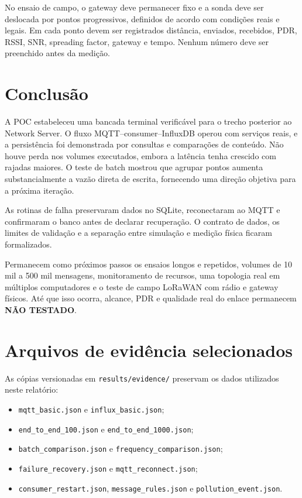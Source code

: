 \documentclass[12pt,a4paper]{article}
\newcommand{\nottested}{\textcolor{vermelhofail}{\textbf{NÃO TESTADO}}}
\newcommand{\code}[1]{\texttt{#1}}
\begin{document}
No ensaio de campo, o gateway deve permanecer fixo e a sonda deve ser deslocada por pontos progressivos, definidos de acordo com condições reais e legais. Em cada ponto devem ser registrados distância, enviados, recebidos, PDR, RSSI, SNR, spreading factor, gateway e tempo. Nenhum número deve ser preenchido antes da medição.

\section{Conclusão}

A POC estabeleceu uma bancada terminal verificável para o trecho posterior ao Network Server. O fluxo MQTT--consumer--InfluxDB operou com serviços reais, e a persistência foi demonstrada por consultas e comparações de conteúdo. Não houve perda nos volumes executados, embora a latência tenha crescido com rajadas maiores. O teste de batch mostrou que agrupar pontos aumenta substancialmente a vazão direta de escrita, fornecendo uma direção objetiva para a próxima iteração.

As rotinas de falha preservaram dados no SQLite, reconectaram ao MQTT e confirmaram o banco antes de declarar recuperação. O contrato de dados, os limites de validação e a separação entre simulação e medição física ficaram formalizados.

Permanecem como próximos passos os ensaios longos e repetidos, volumes de 10 mil a 500 mil mensagens, monitoramento de recursos, uma topologia real em múltiplos computadores e o teste de campo LoRaWAN com rádio e gateway físicos. Até que isso ocorra, alcance, PDR e qualidade real do enlace permanecem \nottested.

\appendix
\section{Arquivos de evidência selecionados}

As cópias versionadas em \code{results/evidence/} preservam os dados utilizados neste relatório:

\begin{itemize}
  \item \code{mqtt\_basic.json} e \code{influx\_basic.json};
  \item \code{end\_to\_end\_100.json} e \code{end\_to\_end\_1000.json};
  \item \code{batch\_comparison.json} e \code{frequency\_comparison.json};
  \item \code{failure\_recovery.json} e \code{mqtt\_reconnect.json};
  \item \code{consumer\_restart.json}, \code{message\_rules.json} e \code{pollution\_event.json}.
\end{itemize}
\end{document}

